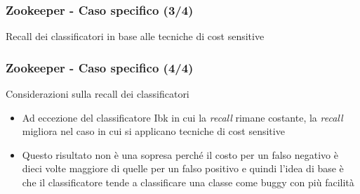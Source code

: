 \documentclass[
	usepdftitle=false,
	xcolor={table, dvipsnames},
	hyperref={
		pdftitle={Machine Learning per Software Engineering},
    	pdfauthor={Alessando Chillotti}
    }
]{beamer}
\begin{document}
\begin{frame}
\frametitle{Zookeeper - Caso specifico (3/4)}
\begin{block}{Recall dei classificatori in base alle tecniche di cost sensitive}
\begin{figure}[ht!]
\end{figure}
\end{block}
\end{frame}

\begin{frame}
\frametitle{Zookeeper - Caso specifico (4/4)}
\begin{block}{Considerazioni sulla recall dei classificatori}
\begin{itemize}
\item Ad eccezione del classificatore Ibk in cui la \textit{recall} rimane costante, la \textit{recall} migliora nel caso in cui si applicano tecniche di cost sensitive
\item Questo risultato non è una sopresa perché il costo per un falso negativo è dieci volte maggiore di quelle per un falso positivo e quindi l'idea di base è che il classificatore tende a classificare una classe come buggy con più facilità
\end{itemize}
\end{block}
\end{frame}
\end{document}
